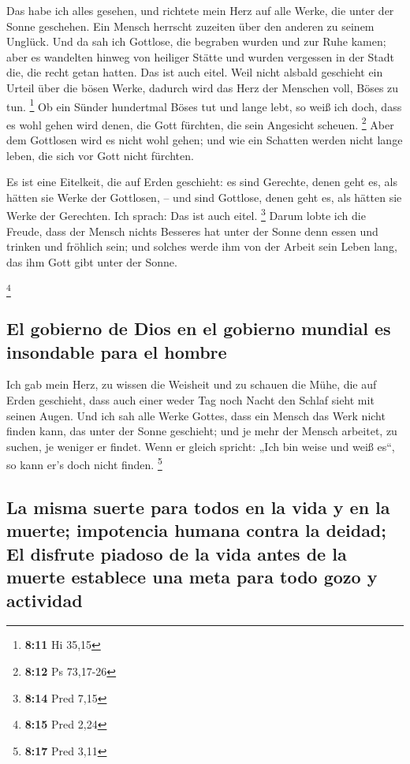  Das habe ich alles gesehen, und richtete mein Herz auf
alle Werke, die unter der Sonne geschehen. Ein Mensch herrscht zuzeiten
über den anderen zu seinem Unglück.  Und da sah ich
Gottlose, die begraben wurden und zur Ruhe kamen; aber es wandelten
hinweg von heiliger Stätte und wurden vergessen in der Stadt die, die
recht getan hatten. Das ist auch eitel.  Weil nicht
alsbald geschieht ein Urteil über die bösen Werke, dadurch wird das Herz
der Menschen voll, Böses zu tun. \footnote{\textbf{8:11} Hi 35,15}
 Ob ein Sünder hundertmal Böses tut und lange lebt, so
weiß ich doch, dass es wohl gehen wird denen, die Gott fürchten, die
sein Angesicht scheuen. \footnote{\textbf{8:12} Ps 73,17-26}
 Aber dem Gottlosen wird es nicht wohl gehen; und wie ein
Schatten werden nicht lange leben, die sich vor Gott nicht fürchten.

 Es ist eine Eitelkeit, die auf Erden geschieht: es sind
Gerechte, denen geht es, als hätten sie Werke der Gottlosen, -- und sind
Gottlose, denen geht es, als hätten sie Werke der Gerechten. Ich sprach:
Das ist auch eitel. \footnote{\textbf{8:14} Pred 7,15} 
Darum lobte ich die Freude, dass der Mensch nichts Besseres hat unter
der Sonne denn essen und trinken und fröhlich sein; und solches werde
ihm von der Arbeit sein Leben lang, das ihm Gott gibt unter der Sonne.

\footnote{\textbf{8:15} Pred 2,24}

\hypertarget{el-gobierno-de-dios-en-el-gobierno-mundial-es-insondable-para-el-hombre}{%
\subsection{El gobierno de Dios en el gobierno mundial es insondable
para el
hombre}\label{el-gobierno-de-dios-en-el-gobierno-mundial-es-insondable-para-el-hombre}}

 Ich gab mein Herz, zu wissen die Weisheit und zu schauen
die Mühe, die auf Erden geschieht, dass auch einer weder Tag noch Nacht
den Schlaf sieht mit seinen Augen.  Und ich sah alle
Werke Gottes, dass ein Mensch das Werk nicht finden kann, das unter der
Sonne geschieht; und je mehr der Mensch arbeitet, zu suchen, je weniger
er findet. Wenn er gleich spricht: „Ich bin weise und weiß es``, so kann
er's doch nicht finden. \footnote{\textbf{8:17} Pred 3,11}

\hypertarget{la-misma-suerte-para-todos-en-la-vida-y-en-la-muerte-impotencia-humana-contra-la-deidad-el-disfrute-piadoso-de-la-vida-antes-de-la-muerte-establece-una-meta-para-todo-gozo-y-actividad}{%
\subsection{La misma suerte para todos en la vida y en la muerte;
impotencia humana contra la deidad; El disfrute piadoso de la vida antes
de la muerte establece una meta para todo gozo y
actividad}\label{la-misma-suerte-para-todos-en-la-vida-y-en-la-muerte-impotencia-humana-contra-la-deidad-el-disfrute-piadoso-de-la-vida-antes-de-la-muerte-establece-una-meta-para-todo-gozo-y-actividad}}

